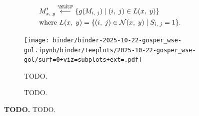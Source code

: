 \begin{figure}
\begin{minipage}[c]{1.0\linewidth}
\begin{subfigure}[]{0.35\linewidth}
    \begin{align*}
    &M_{\fontsize{2}{12} \selectfont x,\; y}'
    \stackrel{\substack{\text{\tiny random} \\[-0.7ex] \text{\tiny choice} \\[0.5ex] }}{\longleftarrow}
    \{g(M_{\fontsize{2}{12} \selectfont i,\; j}) \mid (i,\; j) \in L(x,\; y)\}\\
    &\text{where } L(x,\; y) =  \{(i,\; j) \in \mathcal{N}(x,\; y) \mid S_{\fontsize{2}{12} \selectfont i,\; j}=1\}.
\end{align*}
\end{subfigure}%
\begin{subfigure}[]{0.65\linewidth}
    \centering
    \texttt{[image: binder/binder-2025-10-22-gosper\_wse-gol.ipynb/binder/teeplots/2025-10-22-gosper\_wse-gol/surf=0+viz=subplots+ext=.pdf]}
\end{subfigure}
\end{minipage}

\vspace{-1ex}
\begin{minipage}[c]{1.0\linewidth}%
\begin{subfigure}[]{0.35\linewidth}
    \caption{\footnotesize
    TODO.
    }
    \label{fig:use-case-gol:schematic}
\end{subfigure}%
\begin{subfigure}[]{0.65\linewidth}
    \caption{\footnotesize
    TODO.
    }
    \label{fig:use-case-gol:phylo}
\end{subfigure}%
\end{minipage}

\caption{%
\textbf{TODO.}
\footnotesize
TODO.
}
\label{fig:use-case-gol}
\end{figure}
